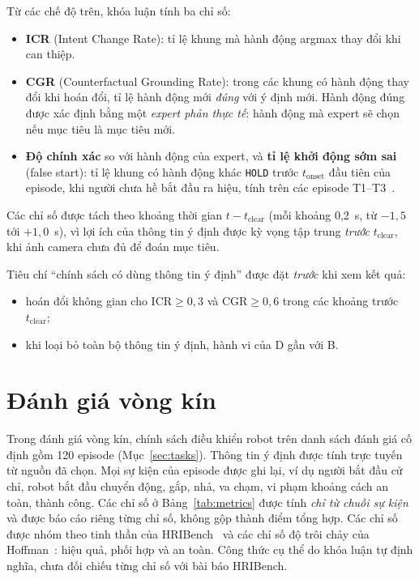 Từ các chế độ trên, khóa luận tính ba chỉ số:
\begin{itemize}
  \item \textbf{ICR} (Intent Change Rate): tỉ lệ khung mà hành động argmax thay đổi khi can thiệp.
  \item \textbf{CGR} (Counterfactual Grounding Rate): trong các khung có hành động thay đổi khi hoán đổi, tỉ lệ hành động mới \emph{đúng} với ý định mới. Hành động đúng được xác định bằng một \emph{expert phản thực tế}: hành động mà expert sẽ chọn nếu mục tiêu là mục tiêu mới.
  \item \textbf{Độ chính xác} so với hành động của expert, và \textbf{tỉ lệ khởi động sớm sai} (false start): tỉ lệ khung có hành động khác \texttt{HOLD} trước $t_\text{onset}$ đầu tiên của episode, khi người chưa hề bắt đầu ra hiệu, tính trên các episode T1--T3~\cite{xu2026learning}.
\end{itemize}

Các chỉ số được tách theo khoảng thời gian $t - t_\text{clear}$ (mỗi khoảng 0,2~s, từ $-1{,}5$ tới $+1{,}0$~s), vì lợi ích của thông tin ý định được kỳ vọng tập trung \emph{trước} $t_\text{clear}$, khi ảnh camera chưa đủ để đoán mục tiêu.

Tiêu chí ``chính sách có dùng thông tin ý định'' được đặt \emph{trước} khi xem kết quả:
\begin{itemize}
  \item hoán đổi không gian cho $\text{ICR} \geq 0{,}3$ và $\text{CGR} \geq 0{,}6$ trong các khoảng trước $t_\text{clear}$;
  \item khi loại bỏ toàn bộ thông tin ý định, hành vi của D gần với B.
\end{itemize}

\section{Đánh giá vòng kín}
\label{sec:closed-loop-metrics}

Trong đánh giá vòng kín, chính sách điều khiển robot trên danh sách đánh giá cố định gồm 120 episode (Mục~\ref{sec:tasks}). Thông tin ý định được tính trực tuyến từ nguồn đã chọn. Mọi sự kiện của episode được ghi lại, ví dụ người bắt đầu cử chỉ, robot bắt đầu chuyển động, gắp, nhả, va chạm, vi phạm khoảng cách an toàn, thành công. Các chỉ số ở Bảng~\ref{tab:metrics} được tính \emph{chỉ từ chuỗi sự kiện} và được báo cáo riêng từng chỉ số, không gộp thành điểm tổng hợp. Các chỉ số được nhóm theo tinh thần của HRIBench~\cite{liu2026hribench} và các chỉ số độ trôi chảy của Hoffman~\cite{hoffman2019fluency}: hiệu quả, phối hợp và an toàn. Công thức cụ thể do khóa luận tự định nghĩa, chưa đối chiếu từng chỉ số với bài báo HRIBench.


